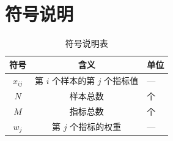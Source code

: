 
\section{符号说明}

\begin{table}[htbp]
\centering
\caption{符号说明表}
\label{tab:notation}
\begin{tabular}{ccl}
\toprule
\textbf{符号} & \textbf{含义} & \textbf{单位} \\
\midrule
$x_{ij}$      & 第 $i$ 个样本的第 $j$ 个指标值 & — \\
$N$           & 样本总数 & 个 \\
$M$           & 指标总数 & 个 \\
$w_j$         & 第 $j$ 个指标的权重 & — \\
\bottomrule
\end{tabular}
\end{table}

% 
